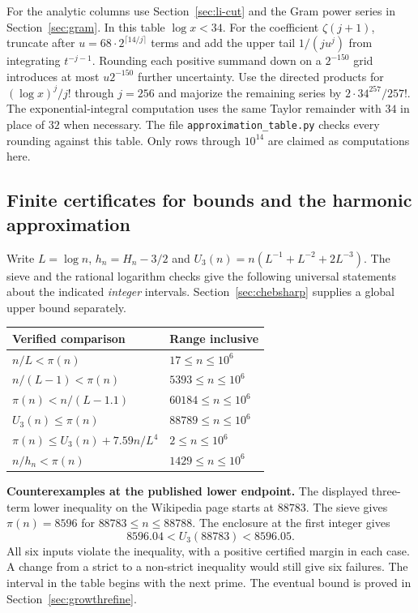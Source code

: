 For the analytic columns use Section~\ref{sec:li-cut} and the Gram power series in Section~\ref{sec:gram}. In this table $\log x<34$. For the coefficient $\zeta(j+1)$, truncate after $u=68\cdot2^{\lceil14/j\rceil}$ terms and add the upper tail $1/(ju^j)$ from integrating $t^{-j-1}$. Rounding each positive summand down on a $2^{-150}$ grid introduces at most $u2^{-150}$ further uncertainty. Use the directed products for $(\log x)^j/j!$ through $j=256$ and majorize the remaining series by $2\cdot34^{257}/257!$. The exponential-integral computation uses the same Taylor remainder with $34$ in place of $32$ when necessary. The file \texttt{approximation\_table.py} checks every rounding against this table. Only rows through $10^{14}$ are claimed as computations here.

\subsection{Finite certificates for bounds and the harmonic approximation}
Write $L=\log n$, $h_n=H_n-3/2$ and $U_3(n)=n(L^{-1}+L^{-2}+2L^{-3})$. The sieve and the rational logarithm checks give the following universal statements about the indicated \emph{integer} intervals. Section~\ref{sec:chebsharp} supplies a global upper bound separately.
\begin{center}\small
\begin{tabular}{@{}p{.62\linewidth}l@{}}
\toprule
Verified comparison & Range inclusive\\ \midrule
$n/L<\pi(n)$ & $17\le n\le10^6$\\
$n/(L-1)<\pi(n)$ & $5393\le n\le10^6$\\
$\pi(n)<n/(L-1.1)$ & $60184\le n\le10^6$\\
$U_3(n)\le\pi(n)$ & $88789\le n\le10^6$\\
$\pi(n)\le U_3(n)+7.59n/L^4$ & $2\le n\le10^6$\\
$n/h_n<\pi(n)$ & $1429\le n\le10^6$\\
\bottomrule
\end{tabular}
\end{center}

\textbf{Counterexamples at the published lower endpoint.}
The displayed three-term lower inequality on the Wikipedia page starts at $88783$. The sieve gives $\pi(n)=8596$ for $88783\le n\le88788$. The enclosure at the first integer gives
\[
 8596.04<U_3(88783)<8596.05 .
\]
All six inputs violate the inequality, with a positive certified margin in each case. A change from a strict to a non-strict inequality would still give six failures. The interval in the table begins with the next prime. The eventual bound is proved in Section~\ref{sec:growthrefine}.

